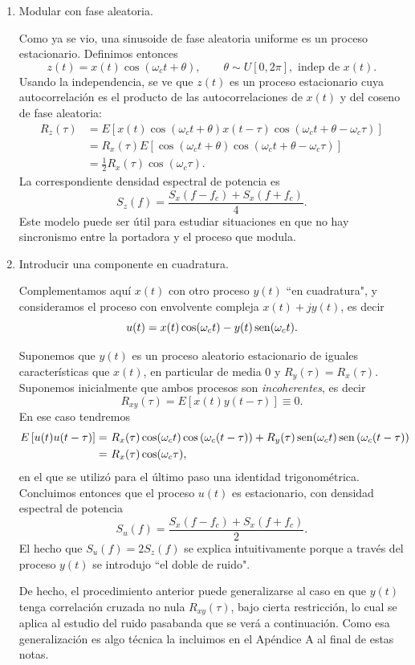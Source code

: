 \begin{enumerate}
\item Modular con fase aleatoria.

Como ya se vio, una sinusoide de fase aleatoria uniforme es un proceso estacionario. Definimos entonces
\[z(t)=x(t)\cos(\omega_ct+\theta),\qquad \theta\sim U[0,2\pi],\text{ indep de }x(t).\]
Usando la independencia, se ve que $z(t)$ es un proceso estacionario cuya autocorrelación es el
producto de las autocorrelaciones de $x(t)$ y del coseno de fase
aleatoria:
\begin{align*}
    R_z(\tau)&=E\left[x(t)\cos(\omega_ct+\theta)x(t-\tau)\cos(\omega_ct+\theta-\omega_c\tau)\right]
    \\ & = R_x(\tau)E\left[\cos(\omega_ct+\theta)\cos(\omega_ct+\theta-\omega_c\tau)\right]
    \\ &=\frac{1}{2}R_x(\tau)\cos(\omega_c\tau).
\end{align*}
La correspondiente densidad espectral de potencia es
\[
 S_z(f) =\frac{S_x(f-f_c)+S_x(f+f_c)}{4}.
\]
Este modelo puede ser útil para estudiar situaciones en que no hay sincronismo entre la portadora y el proceso que modula.

\item Introducir una componente en cuadratura.

Complementamos aquí $x(t)$ con otro proceso $y(t)$ ``en
cuadratura",  y consideramos el proceso con envolvente compleja
$x(t) + j y(t)$, es decir
\[
u(t)=x(t)\cos(\omega_ct)  -y(t)\operatorname{sen}(\omega_ct).\]

Suponemos que $y(t)$ es un proceso aleatorio estacionario de iguales características que
$x(t)$, en particular de media 0 y $R_y(\tau)=R_x(\tau)$. Suponemos inicialmente que ambos procesos son
\emph{incoherentes}, es decir
\[
R_{xy} (\tau) = E[x(t)y(t-\tau)] \equiv 0.\]
En ese caso tendremos
\begin{align*}
                E\left[u(t)u(t-\tau)\right]  = &
                \ R_x(\tau)\cos(\omega_ct)\cos\left(\omega_c(t-\tau)\right)
                                 + R_y(\tau)\sen(\omega_ct)\sen\left(\omega_c(t-\tau)\right) \\
                                 = & \ R_x(\tau)\cos(\omega_c\tau),
            \end{align*}
en el que se utilizó para el último paso una identidad trigonométrica. Concluimos entonces que
el proceso $u(t)$ es estacionario, con densidad espectral de potencia
\[
S_u(f)=\frac{S_x(f-f_c)+S_x(f+f_c)}{2}.
\]
El hecho que $S_u(f)=2 S_z(f)$ se explica intuitivamente porque a través del proceso $y(t)$ se introdujo
``el doble de ruido".

De hecho, el procedimiento anterior puede generalizarse al caso en que $y(t)$ tenga correlación cruzada no nula
$R_{xy}(\tau)$, bajo cierta restricción, lo cual se aplica al estudio del ruido pasabanda que se verá a continuación.
Como esa generalización es algo técnica la incluimos en el Apéndice A al final de estas notas.
\end{enumerate}

